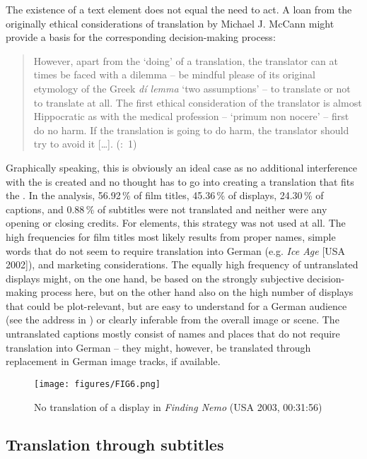 The existence of a text element does not equal the need to act. A loan from the originally ethical considerations of translation by Michael J. McCann might provide a basis for the corresponding decision-making process:
\begin{quote}
However, apart from the ‘doing’ of a translation, the translator can at times be faced with a dilemma – be mindful please of its original etymology of the Greek \textit{dí lemma} ‘two assumptions’ – to translate or not to translate at all. The first ethical consideration of the translator is almost Hippocratic as with the medical profession – ‘primum non nocere’ – first do no harm. If the translation is going to do harm, the translator should try to avoid it […]. (\citeyear{mccann2005}:~1)
\end{quote}
Graphically speaking, this is obviously an ideal case as no additional interference with the  is created and no thought has to go into creating a translation that fits the . In the analysis, 56.92\,\% of film titles, 45.36\,\% of displays, 24.30\,\% of captions, and 0.88\,\% of subtitles were not translated and neither were any opening or closing credits. For  elements, this strategy was not used at all. The high frequencies for film titles most likely results from proper names, simple words that do not seem to require translation into German (e.g. \textit{Ice Age} [USA 2002]), and marketing considerations. The equally high frequency of untranslated displays might, on the one hand, be based on the strongly subjective decision-making process here, but on the other hand also on the high number of displays that could be plot-relevant, but are easy to understand for a German audience (see the address in ) or clearly inferable from the overall image or scene. The untranslated captions mostly consist of names and places that do not require translation into German – they might, however, be translated through replacement in German image tracks, if available.

\begin{figure}
\texttt{[image: figures/FIG6.png]}
\caption{No translation of a display in \textit{Finding Nemo} (USA 2003, 00:31:56)}
\label{fig:FIG6}
\end{figure}

\subsection{Translation through subtitles}\label{sec:2.5.2}

